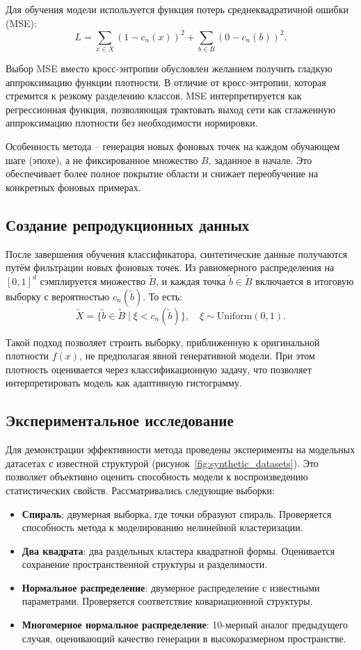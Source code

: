 Для обучения модели используется функция потерь среднеквадратичной ошибки (MSE):
\[
L = \sum_{x \in X} (1 - c_n(x))^2 + \sum_{b \in B} (0 - c_n(b))^2.
\]

Выбор MSE вместо кросс-энтропии обусловлен желанием получить гладкую аппроксимацию функции плотности. В отличие от кросс-энтропии, которая стремится к резкому разделению классов, MSE интерпретируется как регрессионная функция, позволяющая трактовать выход сети как сглаженную аппроксимацию плотности без необходимости нормировки.

Особенность метода -- генерация новых фоновых точек на каждом обучающем шаге (эпохе), а не фиксированное множество \(B\), заданное в начале. Это обеспечивает более полное покрытие области и снижает переобучение на конкретных фоновых примерах.

\subsection{Создание репродукционных данных}

После завершения обучения классификатора, синтетические данные получаются путём фильтрации новых фоновых точек. Из равномерного распределения на \([0, 1]^d\) сэмплируется множество \(\tilde{B}\), и каждая точка \(\tilde{b} \in \tilde{B}\) включается в итоговую выборку с вероятностью \(c_n(\tilde{b})\). То есть:
\[
\tilde{X} = \{ \tilde{b} \in \tilde{B} \mid \xi < c_n(\tilde{b}) \}, \quad \xi \sim \text{Uniform}(0,1).
\]

Такой подход позволяет строить выборку, приближенную к оригинальной плотности \( f(x) \), не предполагая явной генеративной модели. При этом плотность оценивается через классификационную задачу, что позволяет интерпретировать модель как адаптивную гистограмму.

\subsection{Экспериментальное исследование}

Для демонстрации эффективности метода проведены эксперименты на модельных датасетах с известной структурой (рисунок~\cref{fig:synthetic_datasets}). Это позволяет объективно оценить способность модели к воспроизведению статистических свойств. Рассматривались следующие выборки:

\begin{itemize}
  \item \textbf{Спираль}: двумерная выборка, где точки образуют спираль. Проверяется способность метода к моделированию нелинейной кластеризации.
  \item \textbf{Два квадрата}: два раздельных кластера квадратной формы. Оценивается сохранение пространственной структуры и разделимости.
  \item \textbf{Нормальное распределение}: двумерное распределение с известными параметрами. Проверяется соответствие ковариационной структуры.
  \item \textbf{Многомерное нормальное распределение}: 10-мерный аналог предыдущего случая, оценивающий качество генерации в высокоразмерном пространстве.
\end{itemize}

